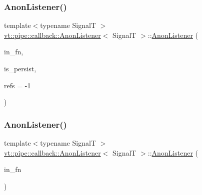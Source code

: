 \mbox{\label{structvt_1_1pipe_1_1callback_1_1_anon_listener_afaa19c0b06e657dc701b60ebc9427b0d}} 
\subsubsection{\texorpdfstring{Anon\+Listener()}{AnonListener()}\hspace{0.1cm}{\footnotesize\ttfamily [4/5]}}
{\footnotesize\ttfamily template$<$typename SignalT $>$ \\
\hyperlink{structvt_1_1pipe_1_1callback_1_1_anon_listener}{vt\+::pipe\+::callback\+::\+Anon\+Listener}$<$ SignalT $>$\+::\hyperlink{structvt_1_1pipe_1_1callback_1_1_anon_listener}{Anon\+Listener} (\begin{DoxyParamCaption}\item[{\hyperlink{structvt_1_1pipe_1_1callback_1_1_anon_listener_ad5d8a2cc6a1599642855e92bbd10f89c}{Callback\+Fn\+Type} const \&}]{in\+\_\+fn,  }\item[{bool}]{is\+\_\+persist,  }\item[{\hyperlink{namespacevt_a9b39ce9494bb04674d0d5b895a5aa50f}{Ref\+Type}}]{refs = {\ttfamily -\/1} }\end{DoxyParamCaption})}

\mbox{\label{structvt_1_1pipe_1_1callback_1_1_anon_listener_ad7eef759667c0dcff5506ab45e28eda4}} 
\subsubsection{\texorpdfstring{Anon\+Listener()}{AnonListener()}\hspace{0.1cm}{\footnotesize\ttfamily [5/5]}}
{\footnotesize\ttfamily template$<$typename SignalT $>$ \\
\hyperlink{structvt_1_1pipe_1_1callback_1_1_anon_listener}{vt\+::pipe\+::callback\+::\+Anon\+Listener}$<$ SignalT $>$\+::\hyperlink{structvt_1_1pipe_1_1callback_1_1_anon_listener}{Anon\+Listener} (\begin{DoxyParamCaption}\item[{\hyperlink{structvt_1_1pipe_1_1callback_1_1_anon_listener_ad5d8a2cc6a1599642855e92bbd10f89c}{Callback\+Fn\+Type} const \&}]{in\+\_\+fn }\end{DoxyParamCaption})\hspace{0.3cm}{\ttfamily [explicit]}}



